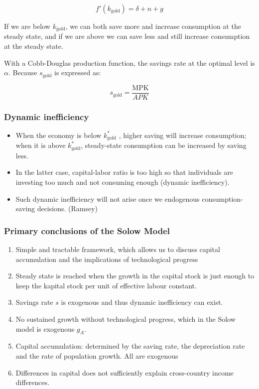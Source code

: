 $$f'(k_\text{gold}) = \delta + n + g $$

If we are below $k_\text{gold}$, we can both save more and increase consumption at the steady state, and if we are above we can save less and still increase consumption at the steady state. 

With a Cobb-Douglas production function, the savings rate at the optimal level is $\alpha$. Because $s_{\text{gold}}$ is expressed as:

$$
s_{\text{gold}} = \frac{\text{MPK}}{APK}
$$

\subsubsection*{Dynamic inefficiency}
\begin{itemize}
    \item When the economy is below $k^*_\text{gold}$ , higher saving will increase consumption; when it is above $k^*_\text{gold}$, steady-state consumption can be increased by saving less.
    \item In the latter case, capital-labor ratio is too high so that individuals are investing too much and not consuming enough (dynamic inefficiency).
    
\item  Such dynamic inefficiency will not arise once we endogenous consumption-saving decisions. (Ramsey)
\end{itemize}
\subsubsection{Primary conclusions of the Solow Model}
\begin{enumerate}[i]
\item Simple and tractable framework, which allows us to discuss capital accumulation and the implications of technological progress
  \item Steady state is reached when the growth in the capital stock is just enough to keep the kapital stock per unit of effective labour constant. 
  \item Savings rate $s$ is exogenous and thus dynamic inefficiency can exist.
  \item No sustained growth without technological progress, which in the Solow model is exogenous $g_A$.
  \item Capital accumulation: determined by the saving rate, the depreciation rate and the rate of population growth. All are exogenous
  \item Differences in capital does not sufficiently explain cross-country income differences. 
\end{enumerate}


